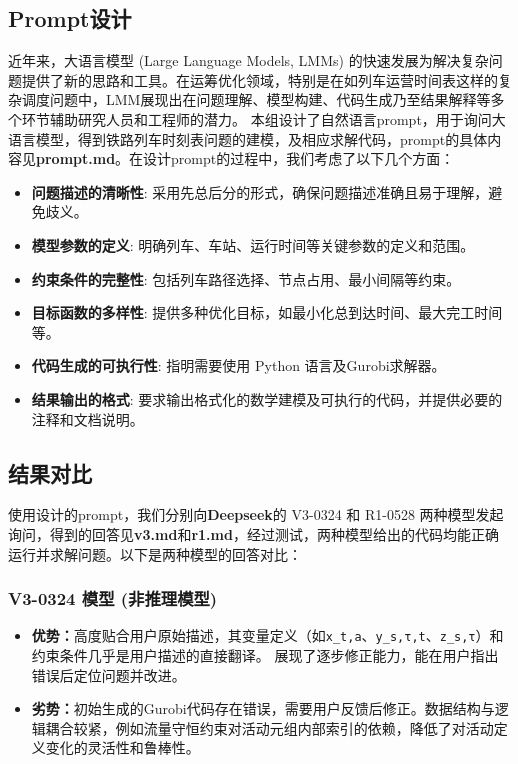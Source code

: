 \documentclass{article}
\begin{document}
\subsection{Prompt设计}
近年来，大语言模型 (Large Language Models, LMMs)
的快速发展为解决复杂问题提供了新的思路和工具。在运筹优化领域，特别是在如列车运营时间表这样的复杂调度问题中，LMM展现出在问题理解、模型构建、代码生成乃至结果解释等多个环节辅助研究人员和工程师的潜力。
本组设计了自然语言prompt，用于询问大语言模型，得到铁路列车时刻表问题的建模，及相应求解代码，prompt的具体内容见\textbf{prompt.md}。在设计prompt的过程中，我们考虑了以下几个方面：
\begin{itemize}
    \item \textbf{问题描述的清晰性}: 采用先总后分的形式，确保问题描述准确且易于理解，避免歧义。
    \item \textbf{模型参数的定义}: 明确列车、车站、运行时间等关键参数的定义和范围。
    \item \textbf{约束条件的完整性}: 包括列车路径选择、节点占用、最小间隔等约束。
    \item \textbf{目标函数的多样性}: 提供多种优化目标，如最小化总到达时间、最大完工时间等。
    \item \textbf{代码生成的可执行性}: 指明需要使用 Python 语言及Gurobi求解器。
    \item \textbf{结果输出的格式}: 要求输出格式化的数学建模及可执行的代码，并提供必要的注释和文档说明。
\end{itemize}

\subsection{结果对比}
使用设计的prompt，我们分别向\textbf{Deepseek}的 V3-0324 和 R1-0528
两种模型发起询问，得到的回答见\textbf{v3.md}和\textbf{r1.md}，经过测试，两种模型给出的代码均能正确运行并求解问题。以下是两种模型的回答对比：
\subsubsection{V3-0324 模型 (非推理模型)}
\begin{itemize}
    \item
        \textbf{优势：}高度贴合用户原始描述，其变量定义（如\texttt{x\_t,a}、\texttt{y\_s,τ,t}、\texttt{z\_s,τ}）和约束条件几乎是用户描述的直接翻译。
        展现了逐步修正能力，能在用户指出错误后定位问题并改进。
    \item
        \textbf{劣势：}初始生成的Gurobi代码存在错误，需要用户反馈后修正。数据结构与逻辑耦合较紧，例如流量守恒约束对活动元组内部索引的依赖，降低了对活动定义变化的灵活性和鲁棒性。
\end{itemize}
\end{document}
